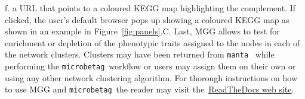 \documentclass[sn-mathphys,Numbered]{sn-jnl}  %
\theoremstyle{thmstyleone}%
\theoremstyle{thmstyletwo}%
\theoremstyle{thmstylethree}%
\newcommand{\microbetag}{\texttt{microbetag}}
\begin{document}
        f. a URL that points to a coloured KEGG map highlighting the complement.
        If clicked, the user's default browser pops up showing a coloured KEGG map as shown in an example in Figure~\ref{fig:panels}.C.
        Last, MGG allows to test for enrichment or depletion of the phenotypic traits assigned to the nodes in each of the network clusters. 
        Clusters may have been returned from \texttt{manta}~\cite{rottjers2020manta} while performing the \microbetag~\space workflow or users may assign them on their own or using any other network clustering algorithm.
        For thorough instructions on how to use MGG and \microbetag~\space the reader may visit the~\href{https://hariszaf.github.io/microbetag/docs/cytoApp/}{ReadTheDocs web site}.

        \newpage
\end{document}
